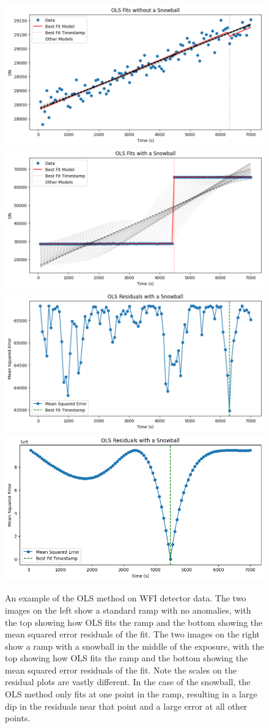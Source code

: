\begin{figure}
    \centering
    \includegraphics[width=.49\linewidth]{figs/rst/ols_good.png}
    \includegraphics[width=.49\linewidth]{figs/rst/ols_bad.png}
    \includegraphics[width=.49\linewidth]{figs/rst/ols_good_res.png}
    \includegraphics[width=.49\linewidth]{figs/rst/ols_bad_res.png}
    \caption[Example of the OLS Method on WFI Detector Data]{
        An example of the OLS method on WFI detector data.
        The two images on the left show a standard ramp with no anomalies, with the top showing how OLS fits the ramp and the bottom showing the mean squared error residuals of the fit.
        The two images on the right show a ramp with a snowball in the middle of the exposure, with the top showing how OLS fits the ramp and the bottom showing the mean squared error residuals of the fit.
        Note the scales on the residual plots are vastly different.
        In the case of the snowball, the OLS method only fits at one point in the ramp, resulting in a large dip in the residuals near that point and a large error at all other points.
    }
    \label{rst/fig:jwst_ols}
\end{figure}


